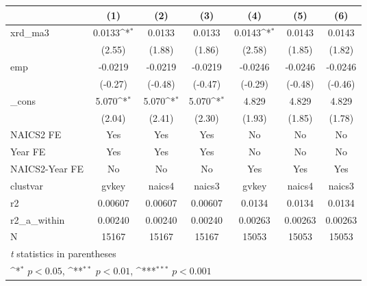 {
\def\sym#1{\ifmmode^{#1}\else\(^{#1}\)\fi}
\begin{tabular}{l*{6}{c}}
\hline\hline
            &\multicolumn{1}{c}{(1)}         &\multicolumn{1}{c}{(2)}         &\multicolumn{1}{c}{(3)}         &\multicolumn{1}{c}{(4)}         &\multicolumn{1}{c}{(5)}         &\multicolumn{1}{c}{(6)}         \\
\hline
xrd\_ma3     &      0.0133\sym{*}  &      0.0133         &      0.0133         &      0.0143\sym{*}  &      0.0143         &      0.0143         \\
            &      (2.55)         &      (1.88)         &      (1.86)         &      (2.58)         &      (1.85)         &      (1.82)         \\
[1em]
emp         &     -0.0219         &     -0.0219         &     -0.0219         &     -0.0246         &     -0.0246         &     -0.0246         \\
            &     (-0.27)         &     (-0.48)         &     (-0.47)         &     (-0.29)         &     (-0.48)         &     (-0.46)         \\
[1em]
\_cons      &       5.070\sym{*}  &       5.070\sym{*}  &       5.070\sym{*}  &       4.829         &       4.829         &       4.829         \\
            &      (2.04)         &      (2.41)         &      (2.30)         &      (1.93)         &      (1.85)         &      (1.78)         \\
[1em]
NAICS2 FE   &         Yes         &         Yes         &         Yes         &          No         &          No         &          No         \\
[1em]
Year FE     &         Yes         &         Yes         &         Yes         &          No         &          No         &          No         \\
[1em]
NAICS2-Year FE&          No         &          No         &          No         &         Yes         &         Yes         &         Yes         \\
\hline
clustvar    &       gvkey         &      naics4         &      naics3         &       gvkey         &      naics4         &      naics3         \\
r2          &     0.00607         &     0.00607         &     0.00607         &      0.0134         &      0.0134         &      0.0134         \\
r2\_a\_within &     0.00240         &     0.00240         &     0.00240         &     0.00263         &     0.00263         &     0.00263         \\
N           &       15167         &       15167         &       15167         &       15053         &       15053         &       15053         \\
\hline\hline
\multicolumn{7}{l}{\footnotesize \textit{t} statistics in parentheses}\\
\multicolumn{7}{l}{\footnotesize \sym{*} \(p<0.05\), \sym{**} \(p<0.01\), \sym{***} \(p<0.001\)}\\
\end{tabular}
}
